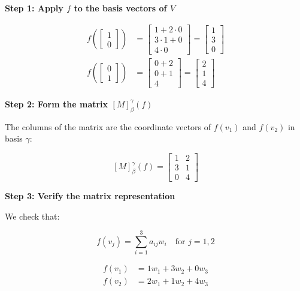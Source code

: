 \textbf{Step 1: Apply \( f \) to the basis vectors of \( V \)}

\begin{align*}
    f\left( \begin{bmatrix}1\\0\end{bmatrix} \right)
     & = \begin{bmatrix} 1 + 2\cdot 0 \\ 3\cdot 1 + 0 \\ 4\cdot 0 \end{bmatrix}
    = \begin{bmatrix} 1 \\ 3 \\ 0 \end{bmatrix}                                 \\[1em]
    f\left( \begin{bmatrix}0\\1\end{bmatrix} \right)
     & = \begin{bmatrix} 0 + 2 \\ 0 + 1 \\ 4 \end{bmatrix}
    = \begin{bmatrix} 2 \\ 1 \\ 4 \end{bmatrix}
\end{align*}

\textbf{Step 2: Form the matrix \( [M]_{\beta}^{\gamma}(f) \)}

The columns of the matrix are the coordinate vectors of \( f(v_1) \) and \( f(v_2) \) in basis \( \gamma \):

\[
    [M]_{\beta}^{\gamma}(f) =
    \begin{bmatrix}
        1 & 2 \\
        3 & 1 \\
        0 & 4
    \end{bmatrix}
\]

\textbf{Step 3: Verify the matrix representation}

We check that:

\[
    f(v_j) = \sum_{i=1}^3 a_{ij} w_i \quad \text{for } j = 1, 2
\]

\begin{align*}
    f(v_1) & = 1 w_1 + 3 w_2 + 0 w_3 \\
    f(v_2) & = 2 w_1 + 1 w_2 + 4 w_3
\end{align*}

